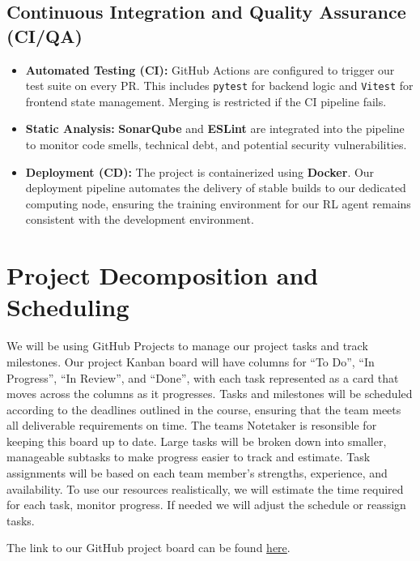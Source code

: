 \documentclass{article}
\begin{document}
\subsection{Continuous Integration and Quality Assurance (CI/QA)}
\begin{itemize}
    \item \textbf{Automated Testing (CI):} GitHub Actions are configured to trigger our test suite on every PR. This includes \texttt{pytest} for backend logic and \texttt{Vitest} for frontend state management. Merging is restricted if the CI pipeline fails.
    \item \textbf{Static Analysis:} \textbf{SonarQube} and \textbf{ESLint} are integrated into the pipeline to monitor code smells, technical debt, and potential security vulnerabilities.
    \item \textbf{Deployment (CD):} The project is containerized using \textbf{Docker}. Our deployment pipeline automates the delivery of stable builds to our dedicated computing node, ensuring the training environment for our RL agent remains consistent with the development environment.
\end{itemize}

\section{Project Decomposition and Scheduling}


\raggedright
We will be using GitHub Projects to manage our project tasks and 
track milestones. Our project Kanban board will have columns for ``To Do'', ``In Progress'', ``In Review'',
and ``Done'', with each task represented as a card that moves across the columns as it progresses. Tasks
and milestones will be scheduled according to the deadlines outlined in the course, ensuring that
the team meets all deliverable requirements on time. The teams Notetaker is resonsible for keeping
this board up to date. Large tasks will be broken down into smaller,
manageable subtasks to make progress easier to track and estimate. Task assignments will be based
on each team member’s strengths, experience, and availability. To use our resources realistically,
we will estimate the time required for each task, monitor progress. If needed we will adjust the
schedule or reassign tasks.

\medskip
The link to our GitHub project board can be found \href{https://github.com/AlgoCatan/RLCatan}{here}.
\end{document}
